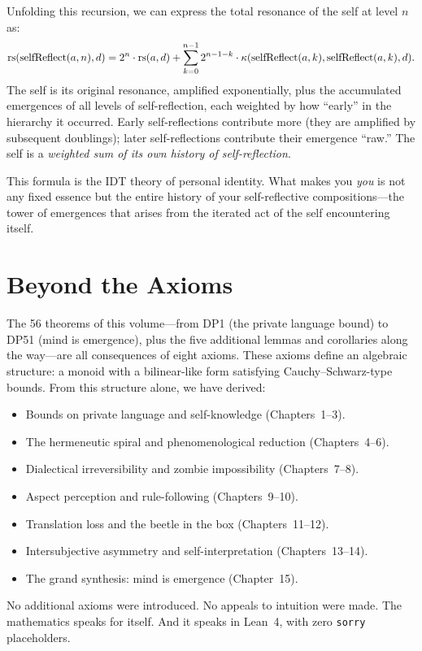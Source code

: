 Unfolding this recursion, we can express the total resonance of the self
at level $n$ as:
\[
\mathrm{rs}(\mathrm{selfReflect}(a, n), d)
= 2^n \cdot \mathrm{rs}(a, d) + \sum_{k=0}^{n-1} 2^{n-1-k} \cdot
  \kappa(\mathrm{selfReflect}(a, k), \mathrm{selfReflect}(a, k), d).
\]
The self is its original resonance, amplified exponentially, plus the
accumulated emergences of all levels of self-reflection, each weighted by
how ``early'' in the hierarchy it occurred.  Early self-reflections
contribute more (they are amplified by subsequent doublings); later
self-reflections contribute their emergence ``raw.''  The self is a
\emph{weighted sum of its own history of self-reflection}.

This formula is the IDT theory of personal identity.  What makes you
\emph{you} is not any fixed essence but the entire history of your
self-reflective compositions---the tower of emergences that arises from
the iterated act of the self encountering itself.

\section{Beyond the Axioms}

The 56 theorems of this volume---from DP1 (the private language bound) to
DP51 (mind is emergence), plus the five additional lemmas and corollaries
along the way---are all consequences of eight axioms.  These axioms define
an algebraic structure: a monoid with a bilinear-like form satisfying
Cauchy--Schwarz-type bounds.  From this structure alone, we have derived:

\begin{itemize}
\item Bounds on private language and self-knowledge (Chapters~1--3).
\item The hermeneutic spiral and phenomenological reduction (Chapters~4--6).
\item Dialectical irreversibility and zombie impossibility (Chapters~7--8).
\item Aspect perception and rule-following (Chapters~9--10).
\item Translation loss and the beetle in the box (Chapters~11--12).
\item Intersubjective asymmetry and self-interpretation (Chapters~13--14).
\item The grand synthesis: mind is emergence (Chapter~15).
\end{itemize}

No additional axioms were introduced.  No appeals to intuition were made.  The
mathematics speaks for itself.  And it speaks in Lean~4, with zero
\texttt{sorry} placeholders.

